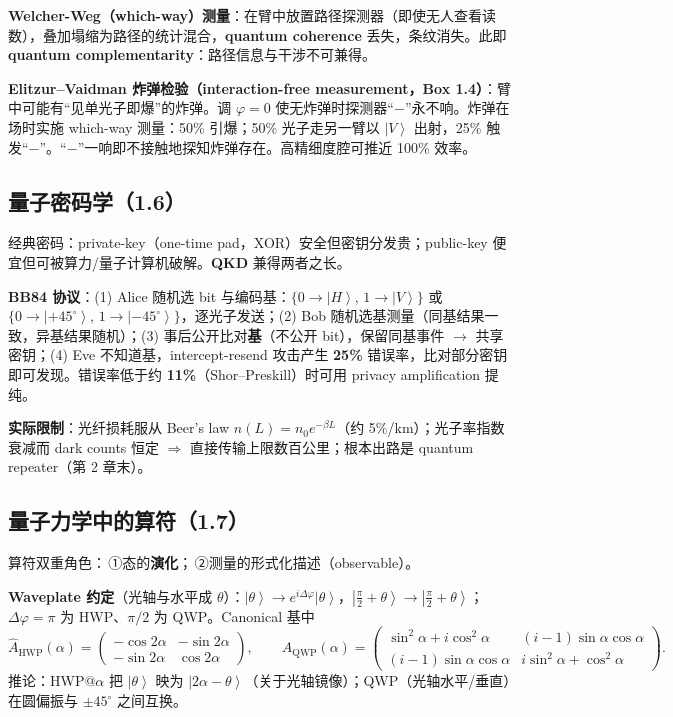 \documentclass[11pt]{ctexart}
\newcommand{\ket}[1]{\left|#1\right\rangle}
\newcommand{\op}[1]{\hat{#1}}
\begin{document}
\textbf{Welcher-Weg（which-way）测量}：在臂中放置路径探测器（即使无人查看读数），叠加塌缩为路径的统计混合，\textbf{quantum coherence} 丢失，条纹消失。此即 \textbf{quantum complementarity}：路径信息与干涉不可兼得。

\textbf{Elitzur--Vaidman 炸弹检验（interaction-free measurement，Box 1.4）}：臂中可能有``见单光子即爆''的炸弹。调 $\varphi=0$ 使无炸弹时探测器``$-$''永不响。炸弹在场时实施 which-way 测量：50\% 引爆；50\% 光子走另一臂以 $\ket V$ 出射，25\% 触发``$-$''。``$-$''一响即不接触地探知炸弹存在。高精细度腔可推近 100\% 效率。

\subsection{量子密码学（1.6）}

经典密码：private-key（one-time pad，XOR）安全但密钥分发贵；public-key 便宜但可被算力/量子计算机破解。\textbf{QKD} 兼得两者之长。

\textbf{BB84 协议}：(1) Alice 随机选 bit 与编码基：$\{0\to\ket H,\,1\to\ket V\}$ 或 $\{0\to\ket{+45^\circ},\,1\to\ket{-45^\circ}\}$，逐光子发送；(2) Bob 随机选基测量（同基结果一致，异基结果随机）；(3) 事后公开比对\textbf{基}（不公开 bit），保留同基事件 $\to$ 共享密钥；(4) Eve 不知道基，intercept-resend 攻击产生 \textbf{25\%} 错误率，比对部分密钥即可发现。错误率低于约 \textbf{11\%}（Shor--Preskill）时可用 privacy amplification 提纯。

\textbf{实际限制}：光纤损耗服从 Beer's law $n(L)=n_0e^{-\beta L}$（约 5\%/km）；光子率指数衰减而 dark counts 恒定 $\Rightarrow$ 直接传输上限数百公里；根本出路是 quantum repeater（第 2 章末）。

\subsection{量子力学中的算符（1.7）}

算符双重角色：\,①态的\textbf{演化}；\,②测量的形式化描述（observable）。

\textbf{Waveplate 约定}（光轴与水平成 $\theta$）：$\ket\theta\to e^{i\Delta\varphi}\ket\theta$，$\ket{\tfrac\pi2+\theta}\to\ket{\tfrac\pi2+\theta}$；$\Delta\varphi=\pi$ 为 HWP、$\pi/2$ 为 QWP。Canonical 基中
\[
\op A_{\mathrm{HWP}}(\alpha)=\begin{pmatrix}-\cos2\alpha&-\sin2\alpha\\-\sin2\alpha&\cos2\alpha\end{pmatrix},\qquad
\op A_{\mathrm{QWP}}(\alpha)=\begin{pmatrix}\sin^2\alpha+i\cos^2\alpha&(i-1)\sin\alpha\cos\alpha\\(i-1)\sin\alpha\cos\alpha&i\sin^2\alpha+\cos^2\alpha\end{pmatrix}.
\]
推论：HWP@$\alpha$ 把 $\ket\theta$ 映为 $\ket{2\alpha-\theta}$（关于光轴镜像）；QWP（光轴水平/垂直）在圆偏振与 $\pm45^\circ$ 之间互换。
\end{document}
